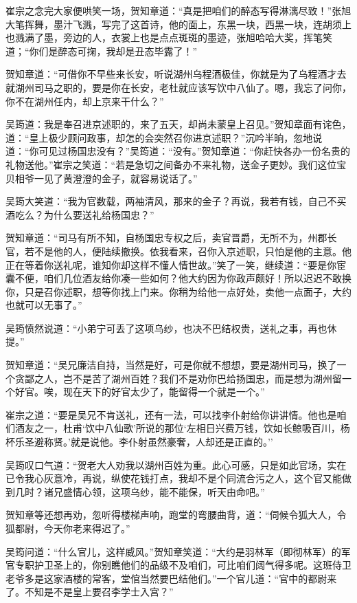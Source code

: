 \documentclass[12pt,oneside]{book}
\begin{document}
崔宗之念完大家便哄笑一场，贺知章道：``真是把咱们的醉态写得淋漓尽致！''张旭大笔挥舞，墨汁飞溅，写完了这首诗，他的面上，东黑一块，西黑一块，连胡须上也溅满了墨，旁边的人，衣裳上也是点点斑斑的墨迹，张旭哈哈大奖，挥笔笑道；``你们是醉态可掬，我却是丑态毕露了！''

贺知章道：``可借你不早些来长安，听说湖州乌程酒极佳，你就是为了乌程酒才去就湖州司马之职的，要是你在长安，老杜就应该写饮中八仙了。嗯，我忘了问你，你不在湖州任内，却上京来干什么？''

吴筠道：我是奉召进京述职的，来了五天，却尚未蒙皇上召见。''贺知章面有诧色，道：``皇上极少顾问政事，却怎的会突然召你进京述职？''沉吟半晌，忽地说道：``你可见过杨国忠没有？''吴筠道：``没有。''贺知章道：``你赶快各办一份名贵的礼物送他。''崔宗之笑道：``若是急切之间备办不来礼物，送金子更妙。我们这位宝贝相爷一见了黄澄澄的金子，就容易说话了。''

吴筠大笑道：``我为官数载，两袖清风，那来的金子？再说，我若有钱，自己不买酒吃么？为什么要送礼给杨国忠？''

贺知章道：``司马有所不知，自杨国忠专权之后，卖官晋爵，无所不为，州郡长官，若不是他的人，便陆续撤换。依我看来，召你入京述职，只怕是他的主意。他正在等着你送礼呢，谁知你却这样不懂人情世故。''笑了一笑，继续道：``要是你宦囊不便，咱们几位酒友给你凑一些如何？他大约因为你政声颇好！所以迟迟不敢换你，只是召你述职，想等你找上门来。你稍为给他一点好处，卖他一点面子，大约也就可以无事了。''

吴筠愤然说道：``小弟宁可丢了这项乌纱，也决不巴结权贵，送礼之事，再也休提。''

贺知章道：``吴兄廉洁自持，当然是好，可是你就不想想，要是湖州司马，换了一个贪鄙之人，岂不是苦了湖州百姓？我们不是劝你巴给扬国忠，而是想为湖州留一个好官。唉，现在天下的好官太少了，能留得一个就是一个。''

崔宗之道：``要是吴兄不肯送礼，还有一法，可以找李仆射给你讲讲情。他也是咱们酒友之一，杜甫`饮中八仙歌'所说的那位`左相日兴费万钱，饮如长鲸吸百川，杨杯乐圣避称贤。'就是说他。李仆射虽然豪奢，人却还是正直的。''

吴筠叹口气道：``贺老大人劝我以湖州百姓为重。此心可感，只是如此官场，实在已令我心灰意冷，再说，纵使花钱打点，我却不是个同流合污之人，这个官又能做到几时？诸兄盛情心领，这项乌纱，能不能保，听天由命吧。''

贺知章等还想再劝，忽听得楼梯声响，跑堂的弯腰曲背，道：``伺候令狐大人，令狐都尉，今天你老来得迟了。''

吴筠问道：``什么官儿，这样威风。''贺知章笑道：``大约是羽林军（即彻林军）的军官专职护卫圣上的，你别瞧他们的品级不及咱们，可比咱们阔气得多呢。这班侍卫老爷多是这家酒楼的常客，堂倌当然要巴结他们。''一个官儿道：``官中的都尉来了。不知是不是皇上要召李学士入宫？''
\end{document}
